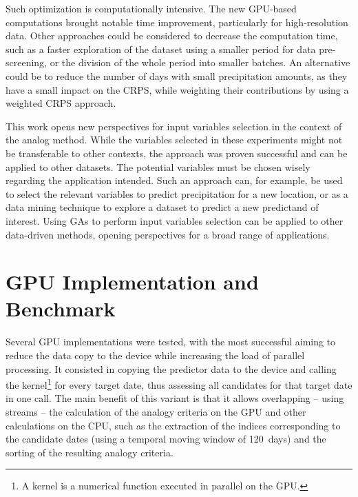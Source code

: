 \documentclass[draft]{agujournal2019}
\begin{document}
Such optimization is computationally intensive. The new GPU-based computations brought notable time improvement, particularly for high-resolution data. Other approaches could be considered to decrease the computation time, such as a faster exploration of the dataset using a smaller period for data pre-screening, or the division of the whole period into smaller batches. An alternative could be to reduce the number of days with small precipitation amounts, as they have a small impact on the CRPS, while weighting their contributions by using a weighted CRPS approach.

This work opens new perspectives for input variables selection in the context of the analog method. While the variables selected in these experiments might not be transferable to other contexts, the approach was proven successful and can be applied to other datasets. The potential variables must be chosen wisely regarding the application intended. Such an approach can, for example, be used to select the relevant variables to predict precipitation for a new location, or as a data mining technique to explore a dataset to predict a new predictand of interest. Using GAs to perform input variables selection can be applied to other data-driven methods, opening perspectives for a broad range of applications.


%
%

\FloatBarrier

\appendix

\section{GPU Implementation and Benchmark}

Several GPU implementations were tested, with the most successful aiming to reduce the data copy to the device while increasing the load of parallel processing. It consisted in copying the predictor data to the device and calling the kernel\footnote{A kernel is a numerical function executed in parallel on the GPU.} for every target date, thus assessing all candidates for that target date in one call. The main benefit of this variant is that it allows overlapping -- using streams -- the calculation of the analogy criteria on the GPU and other calculations on the CPU, such as the extraction of the indices corresponding to the candidate dates (using a temporal moving window of 120~days) and the sorting of the resulting analogy criteria.
\end{document}
